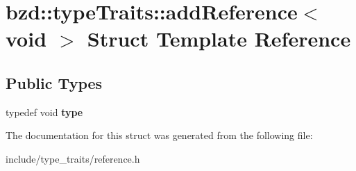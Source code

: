 \hypertarget{structbzd_1_1typeTraits_1_1addReference_3_01void_01_4}{}\section{bzd\+:\+:type\+Traits\+:\+:add\+Reference$<$ void $>$ Struct Template Reference}
\label{structbzd_1_1typeTraits_1_1addReference_3_01void_01_4}
\subsection*{Public Types}
\begin{DoxyCompactItemize}
\item 
\mbox{\label{structbzd_1_1typeTraits_1_1addReference_3_01void_01_4_aa041d64e90d0f15edd716859e5fb8bb6}} 
typedef void {\bfseries type}
\end{DoxyCompactItemize}


The documentation for this struct was generated from the following file\+:\begin{DoxyCompactItemize}
\item 
include/type\+\_\+traits/reference.\+h\end{DoxyCompactItemize}
